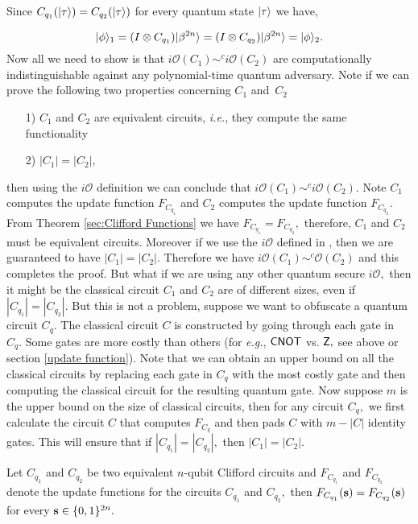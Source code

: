 \begin{itemize}
Since $C_{q_1}({\lvert}\tau\rangle)=C_{q_2}({\lvert}\tau\rangle)$ for every quantum state ${\lvert}\tau\rangle$ we have,

\begin{equation}
\label{eq:1}
{\lvert}\phi\rangle_1=(I\otimes C_{q_1}) {\lvert}\beta^{2n}\rangle=(I\otimes C_{q_2}) {\lvert}\beta^{2n}\rangle={\lvert}\phi\rangle_2.
\end{equation}
Now all we need to show is that $i\mathcal{O}(C_1)\sim^ci\mathcal{O}(C_2)$ are computationally indistinguishable against any polynomial-time quantum adversary. Note if we can  prove the following two properties concerning $C_1$ and~$C_2$

\begin{enumerate}
\item[1)] $C_1$ and $C_2$ are equivalent circuits, \emph{i.e.}, they compute the same functionality
\item[2)]  $|C_1|=|C_2|,$
\end{enumerate}
then using the $i\mathcal{O}$ definition we can conclude that $i\mathcal{O}(C_1)\sim^ci\mathcal{O}(C_2).$ Note $C_1$ computes the update function $F_{C_{q_1}}$ and $C_2$ computes the update function $F_{C_{q_2}}.$ From Theorem \ref{sec:Clifford Functions} we have $F_{C_{q_1}}=F_{C_{q_2}},$ therefore, $C_1$ and $C_2$ must be equivalent circuits. Moreover if we use the $i\mathcal{O}$ defined in , then we are guaranteed to have $|C_1|=|C_2|.$ Therefore we have $i\mathcal{O}(C_1)\sim^c\mathcal{O}(C_2)$ and this completes the proof. But what if we are using any other quantum secure $i\mathcal{O},$ then it might be the classical circuit $C_1$ and $C_2$ are of different sizes, even if  $|C_{q_1}|=|C_{q_2}|.$  But this is not a problem, suppose we want to obfuscate a quantum circuit $C_q$. The classical circuit $C$ is constructed by going through each gate in $C_{q}.$ Some gates are more costly than others (for \emph{e.g.}, ${\sf CNOT}$ vs. ${\sf Z},$ see above or section \ref{update function}). Note that we can obtain an upper bound on all the classical circuits by replacing each gate in $C_q$ with the most costly gate and then computing the classical circuit for the resulting quantum gate. Now suppose $m$ is the upper bound on the size of classical circuits, then for any circuit $C_q,$ we first calculate the circuit $C$ that computes $F_{C_q}$ and then pads $C$ with $m-|C|$ identity gates. This will ensure that if $|C_{q_1}|=|C_{q_2}|,$ then $|C_1|=|C_2|.$
\end{itemize}


\begin{theorem}\label{sec:Clifford Functions}
Let $C_{q_1}$ and $C_{q_2}$ be two equivalent $n$-qubit Clifford circuits and  $F_{C_{q_1}}$ and $F_{C_{q_2}}$  denote the update functions for the circuits $C_{q_1}$ and $C_{q_2},$ then $F_{C_{q_1}}({\bf s})=F_{C_{q_2}}({\bf s})$ for every ${\bf s}\in\{0,1\}^{2n}.$
\end{theorem}

